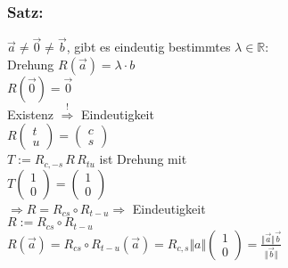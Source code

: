 \subsubsection{Satz:}
$\vec{a} \neq \vec{0} \neq \vec{b}$, gibt es eindeutig bestimmtes $\lambda \in \mathbb{R}:$\\
Drehung $ R(\vec{a})=\lambda \cdot b$\\
$R(\vec{0})=\vec{0}$\\
%
%
%
%
Existenz $\mathop{\Rightarrow}\limits^{\text{!}}$ Eindeutigkeit\\
$R\begin{pmatrix} t \\ u \end{pmatrix} = \begin{pmatrix} c \\ s \end{pmatrix}$\\
$T:= R_{c,-s} \, R \, R_{tu}$ ist Drehung mit\\
$T\begin{pmatrix} 1 \\ 0 \end{pmatrix} = \begin{pmatrix} 1 \\ 0 \end{pmatrix}$\\
$\Rightarrow R = R_{cs} \circ R_{t-u} \Rightarrow$ Eindeutigkeit \\
$R:= R_{cs} \circ R_{t-u}$\\
$R(\vec{a}) = R_{cs} \circ R_{t-u} (\vec{a}) = R_{c,s} \Vert a \Vert \begin{pmatrix} 1 \\ 0 \end{pmatrix} = \frac{\Vert \vec{a}\Vert \vec{b}}{\Vert \vec{b} \Vert}$
%
%
%
